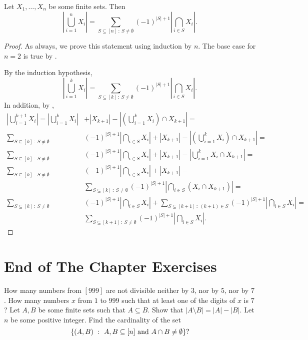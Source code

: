 \begin{corollary}
\label{corollary:inclusion-exclusion-principle}
  Let $X_1, \dots, X_n$ be some finite sets. Then
  \[
    \left|\bigcup_{i = 1}^n X_i\right| =
    \sum_{S \subseteq [n] ~:~ S \neq \emptyset} (-1)^{|S| + 1}
      \left|\bigcap_{i \in S} X_i\right|.
  \]
\end{corollary}
\begin{proof}
  As always, we prove this statement using induction by $n$. The base case for
  $n = 2$ is true by .

  By the induction hypothesis,
  \[
    \left|\bigcup_{i = 1}^k X_i\right| =
    \sum_{S \subseteq [k] ~:~ S \neq \emptyset} (-1)^{|S| + 1} \left|\bigcap_{i \in S} X_i\right|.
  \]
  In addition, by ,
  \begin{align*}
    \left|\bigcup_{i = 1}^{k + 1} X_i\right| =
    \left|\bigcup_{i = 1}^k X_i\right|& + |X_{k + 1}| -
      \left|\left(\bigcup_{i = 1}^k X_i\right) \cap X_{k + 1}\right| = \\
    \sum_{S \subseteq [k] ~:~ S \neq \emptyset}&
          (-1)^{|S| + 1} \left|\bigcap_{i \in S} X_i\right| +
      |X_{k + 1}| -
      \left|\left(\bigcup_{i = 1}^k X_i\right) \cap X_{k + 1}\right| = \\
    \sum_{S \subseteq [k] ~:~ S \neq \emptyset}&
          (-1)^{|S| + 1} \left|\bigcap_{i \in S} X_i\right| +
      |X_{k + 1}| -
      \left|\bigcup_{i = 1}^k X_i \cap X_{k + 1}\right| = \\
    \sum_{S \subseteq [k] ~:~ S \neq \emptyset}&
          (-1)^{|S| + 1} \left|\bigcap_{i \in S} X_i\right| +
      |X_{k + 1}| - \\
    &\sum_{S \subseteq [k] ~:~ S \neq \emptyset}
          (-1)^{|S| + 1} \left|\bigcap_{i \in S} (X_i \cap X_{k + 1})\right| = \\
    \sum_{S \subseteq [k] ~:~ S \neq \emptyset}&
          (-1)^{|S| + 1} \left|\bigcap_{i \in S} X_i\right| +
    \sum_{S \subseteq [k + 1] ~:~ (k + 1) \in S}
          (-1)^{|S| + 1} \left|\bigcap_{i \in S} X_i \right| = \\
    &\sum_{S \subseteq [k + 1] ~:~ S \neq \emptyset}
          (-1)^{|S| + 1} \left|\bigcap_{i \in S} X_i\right|.
  \end{align*}
\end{proof}


\section*{End of The Chapter Exercises}
\begin{exercises}
  \exerciseitem How many numbers from $[999]$ are not divisible neither by $3$,
    nor by $5$, nor by $7$.
  \exerciseitem How many numbers $x$ from $1$ to $999$ such that at least one
    of the digits of $x$ is $7$?
  \exerciseitem Let $A, B$ be some finite sets such that $A \subseteq B$.
    Show that $|A \setminus B| = |A| - |B|$.
  \exerciseitem Let $n$ be some positive integer.
    Find the cardinality of the set
    \[
      \set[{A, B \subseteq [n] \text{ and } A \cap B \neq \emptyset}]{(A, B)}?
    \]
\end{exercises}
